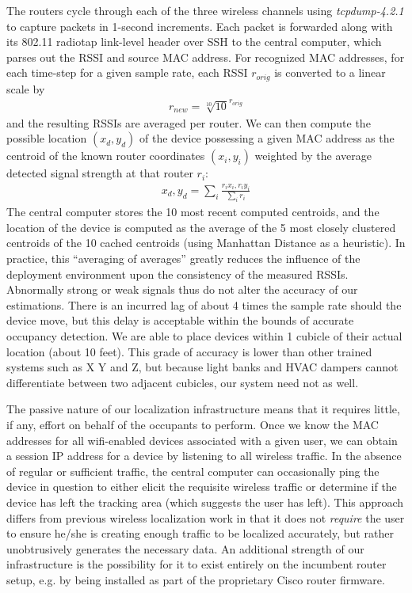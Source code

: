 The routers cycle through each of the three wireless channels using \emph{tcpdump-4.2.1} to capture packets in 1-second increments. Each packet is forwarded along with its 802.11 radiotap link-level header over SSH to the central computer, which parses out the RSSI and source MAC address. For recognized MAC addresses, for each time-step for a given sample rate, each RSSI $r_{orig}$ is converted to a linear scale by
\begin{equation}
\begin{split}
r_{new} = \sqrt[10]{10}^{r_{orig}}
\end{split}
\end{equation}
and the resulting RSSIs are averaged per router. We can then compute the possible location $(x_d,y_d)$ of the device possessing a given MAC address as the centroid of the known router coordinates $(x_i, y_i)$ weighted by the average detected signal strength at that router $r_i$:
\begin{equation}
\begin{split}
x_d, y_d = \displaystyle\sum_{i} \frac{r_ix_i, r_iy_i}{\displaystyle\sum_i r_i}
\end{split}
\end{equation}
The central computer stores the 10 most recent computed centroids, and the location of the device is computed as the average of the 5 most closely clustered centroids of the 10 cached centroids (using Manhattan Distance as a heuristic). In practice, this ``averaging of averages'' greatly reduces the influence of the deployment environment upon the consistency of the measured RSSIs. Abnormally strong or weak signals thus do not alter the accuracy of our estimations. There is an incurred lag of about 4 times the sample rate should the device move, but this delay is acceptable within the bounds of accurate occupancy detection. We are able to place devices within 1 cubicle of their actual location (about 10 feet). This grade of accuracy is lower than other trained systems such as X Y and Z, but because light banks and HVAC dampers cannot differentiate between two adjacent cubicles, our system need not as well.

The passive nature of our localization infrastructure means that it requires little, if any, effort on behalf of the occupants to perform. Once we know the MAC addresses for all wifi-enabled devices associated with a given user, we can obtain a session IP address for a device by listening to all wireless traffic. In the absence of regular or sufficient traffic, the central computer can occasionally ping the device in question to either elicit the requisite wireless traffic or determine if the device has left the tracking area (which suggests the user has left). This approach differs from previous wireless localization work in that it does not \emph{require} the user to ensure he/she is creating enough traffic to be localized accurately, but rather unobtrusively generates the necessary data.
An additional strength of our infrastructure is the possibility for it to exist entirely on the incumbent router setup, e.g. by being installed as part of the proprietary Cisco router firmware. 

